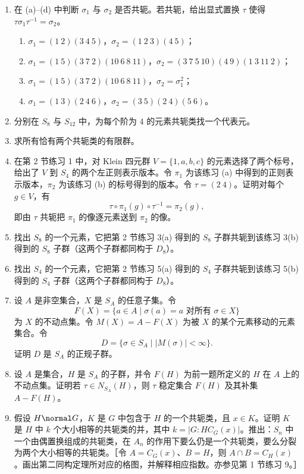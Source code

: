 \begin{enumerate}[label=\arabic*.]
\begin{enumerate}[label=(\alph*)]
    \item $\tau\sigma\tau^{-1}=\sigma^{-2}$。
  \end{enumerate}
  \item 在 (a)--(d) 中判断 $\sigma_1$ 与 $\sigma_2$ 是否共轭。若共轭，给出显式置换 $\tau$ 使得 $\tau\sigma_1\tau^{-1}=\sigma_2$。
  \begin{enumerate}[label=(\alph*)]
    \item $\sigma_1=(1\ 2)(3\ 4\ 5)$，$\sigma_2=(1\ 2\ 3)(4\ 5)$；
    \item $\sigma_1=(1\ 5)(3\ 7\ 2)(10\ 6\ 8\ 11)$，$\sigma_2=(3\ 7\ 5\ 10)(4\ 9)(1\ 3\ 11\ 2)$；
    \item $\sigma_1=(1\ 5)(3\ 7\ 2)(10\ 6\ 8\ 11)$，$\sigma_2=\sigma_1^2$；
    \item $\sigma_1=(1\ 3)(2\ 4\ 6)$，$\sigma_2=(3\ 5)(2\ 4)(5\ 6)$。
  \end{enumerate}
  \item 分别在 $S_8$ 与 $S_{12}$ 中，为每个阶为 $4$ 的元素共轭类找一个代表元。
  \item 求所有恰有两个共轭类的有限群。
  \item 在第 2 节练习 1 中，对 Klein 四元群 $V=\{1,a,b,c\}$ 的元素选择了两个标号，给出了 $V$ 到 $S_4$ 的两个左正则表示版本。令 $\pi_1$ 为该练习 (a) 中得到的正则表示版本，$\pi_2$ 为该练习 (b) 的标号得到的版本。令 $\tau=(2\ 4)$。证明对每个 $g\in V$，有
  \[
    \tau\circ\pi_1(g)\circ\tau^{-1}=\pi_2(g),
  \]
  即由 $\tau$ 共轭把 $\pi_1$ 的像逐元素送到 $\pi_2$ 的像。
  \item 找出 $S_8$ 的一个元素，它把第 2 节练习 3(a) 得到的 $S_8$ 子群共轭到该练习 3(b) 得到的 $S_8$ 子群（这两个子群都同构于 $D_8$）。
  \item 找出 $S_4$ 的一个元素，它把第 2 节练习 5(a) 得到的 $S_4$ 子群共轭到该练习 5(b) 得到的 $S_4$ 子群（这两个子群都同构于 $D_8$）。
  \item 设 $A$ 是非空集合，$X$ 是 $S_A$ 的任意子集。令
  \[
    F(X)=\{a\in A\mid \sigma(a)=a\text{ 对所有 }\sigma\in X\}
  \]
  为 $X$ 的不动点集。令 $M(X)=A-F(X)$ 为被 $X$ 的某个元素移动的元素集合。令
  \[
    D=\{\sigma\in S_A\mid |M(\sigma)|<\infty\}.
  \]
  证明 $D$ 是 $S_A$ 的正规子群。
  \item 设 $A$ 是集合，$H$ 是 $S_A$ 的子群，并令 $F(H)$ 为前一题所定义的 $H$ 在 $A$ 上的不动点集。证明若 $\tau\in N_{S_A}(H)$，则 $\tau$ 稳定集合 $F(H)$ 及其补集 $A-F(H)$。
  \item 假设 $H\normal G$，$K$ 是 $G$ 中包含于 $H$ 的一个共轭类，且 $x\in K$。证明 $K$ 是 $H$ 中 $k$ 个大小相等的共轭类的并，其中 $k=|G:HC_G(x)|$。推出：$S_n$ 中一个由偶置换组成的共轭类，在 $A_n$ 的作用下要么仍是一个共轭类，要么分裂为两个大小相等的共轭类。［令 $A=C_G(x)$、$B=H$，则 $A\cap B=C_H(x)$。画出第二同构定理所对应的格图，并解释相应指数。亦参见第 1 节练习 9。］

\end{enumerate}
